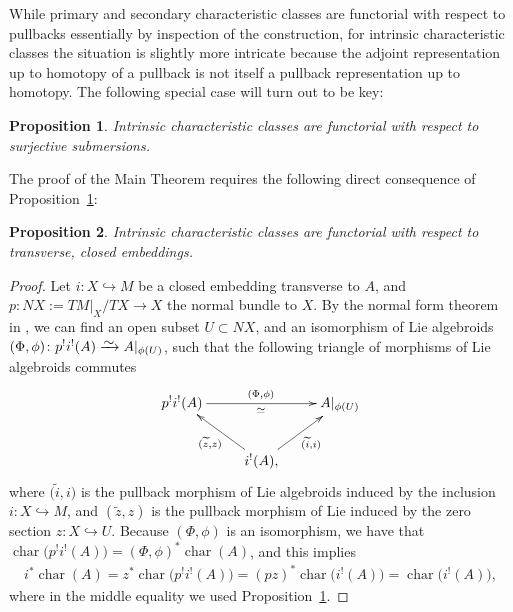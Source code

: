 \documentclass[11pt]{article}
\numberwithin{equation}{section}
\newcommand{\diffto}{\xrightarrow{\raisebox{-0.2 em}[0pt][0pt]{\smash{\ensuremath{\sim}}}}}
\newcommand{\inc}{\hookrightarrow}
\newcommand{\8}{\infty}
\newtheorem{proposition}{Proposition}
\begin{document}
While primary and secondary characteristic classes are functorial with respect to pullbacks essentially by inspection of the construction, for intrinsic characteristic classes the situation is slightly more intricate because the adjoint representation up to homotopy of a pullback is not itself a pullback representation up to homotopy. The following special case will turn out to be key:

\begin{proposition}\label{pro : pullback of char by submersions}
 Intrinsic characteristic classes are functorial with respect to surjective submersions.
\end{proposition}

The proof of the Main Theorem requires the following direct consequence of Proposition~\ref{pro : pullback of char by submersions}:

\begin{proposition}\label{pro : pullback of char by inclusion}
 Intrinsic characteristic classes are functorial with respect to transverse, closed embeddings.
\end{proposition}
\begin{proof}Let $i\colon X \inc M$ be a closed embedding transverse to $A$, and $p\colon NX:=TM|_X/TX \to X$ the normal bundle to $X$. By the normal form theorem in \cite{BLM}, we can find an open subset $U \subset NX$, and an isomorphism of Lie algebroids $(\Phi,\phi) \colon p^!i^!(A) \diffto A|_{\phi(U)}$, such that the following triangle of morphisms of Lie algebroids commutes
\begin{gather*}
 \xymatrix{
 p^!i^!(A) \ar[rr]^{(\Phi,\phi)}_{\simeq} && A|_{\phi(U)}\\
 & i^!(A), \ar[ul]^{(\widetilde{z},z)} \ar[ur]_{(\widetilde{i},i)} &
 }
\end{gather*}where $\big(\widetilde{i},i\big)$ is the pullback morphism of Lie algebroids induced by the inclusion $i\colon X \inc M$, and $(\widetilde{z},z)$ is the pullback morphism of Lie induced by the zero section $z\colon X \inc U$. Because $(\Phi,\phi)$ is an isomorphism, we have that $\operatorname{char}\big(p^!i^!(A)\big) = (\Phi,\phi)^*\operatorname{char}(A)$, and this implies
\begin{gather*}
 i^*\operatorname{char}(A) = z^*\operatorname{char}\big(p^!i^!(A)\big) =(pz)^*\operatorname{char}\big(i^!(A)\big) = \operatorname{char}\big(i^!(A)\big),
\end{gather*}where in the middle equality we used Proposition~\ref{pro : pullback of char by submersions}.
\end{proof}
\end{document}

